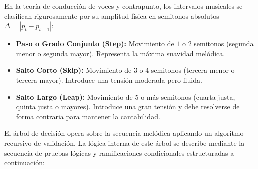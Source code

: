\documentclass[12pt]{report}
\begin{document}
En la teoría de conducción de voces y contrapunto, los intervalos musicales se clasifican rigurosamente por su amplitud física en semitonos absolutos $\Delta = |p_t - p_{t-1}|$:
\begin{itemize}
    \item \textbf{Paso o Grado Conjunto (Step):} Movimiento de $1$ o $2$ semitonos (segunda menor o segunda mayor). Representa la máxima suavidad melódica.
    \item \textbf{Salto Corto (Skip):} Movimiento de $3$ o $4$ semitonos (tercera menor o tercera mayor). Introduce una tensión moderada pero fluida.
    \item \textbf{Salto Largo (Leap):} Movimiento de $5$ o más semitonos (cuarta justa, quinta justa o mayores). Introduce una gran tensión y debe resolverse de forma contraria para mantener la cantabilidad.
\end{itemize}

El árbol de decisión opera sobre la secuencia melódica aplicando un algoritmo recursivo de validación. La lógica interna de este árbol se describe mediante la secuencia de pruebas lógicas y ramificaciones condicionales estructuradas a continuación:
\end{document}
